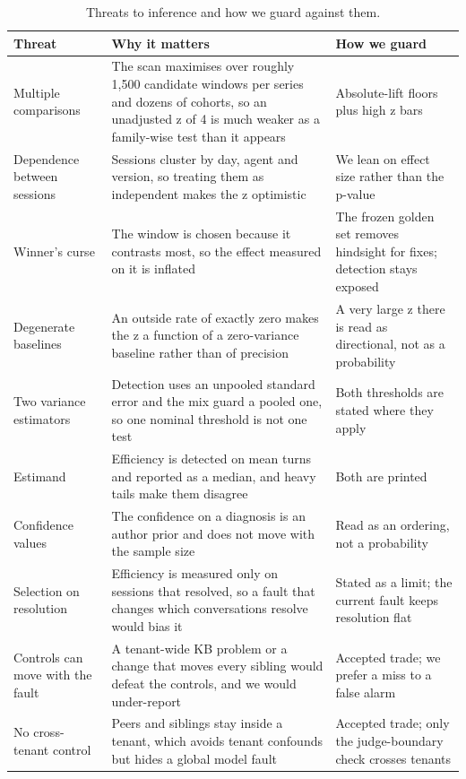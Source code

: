 \documentclass[8pt,twocolumn,a4paper]{extarticle}
\begin{document}
\begin{table}[t]
\centering
\caption{Threats to inference and how we guard against them.}
\label{tab:threats}
\small
\begin{tabular}{p{}p{}p{}}
\toprule
\textbf{Threat} & \textbf{Why it matters} & \textbf{How we guard} \\
\midrule
Multiple comparisons & The scan maximises over roughly 1,500 candidate windows per series and dozens of cohorts, so an unadjusted z of 4 is much weaker as a family-wise test than it appears & Absolute-lift floors plus high z bars \\
Dependence between sessions & Sessions cluster by day, agent and version, so treating them as independent makes the z optimistic & We lean on effect size rather than the p-value \\
Winner's curse & The window is chosen because it contrasts most, so the effect measured on it is inflated & The frozen golden set removes hindsight for fixes; detection stays exposed \\
Degenerate baselines & An outside rate of exactly zero makes the z a function of a zero-variance baseline rather than of precision & A very large z there is read as directional, not as a probability \\
Two variance estimators & Detection uses an unpooled standard error and the mix guard a pooled one, so one nominal threshold is not one test & Both thresholds are stated where they apply \\
Estimand & Efficiency is detected on mean turns and reported as a median, and heavy tails make them disagree & Both are printed \\
Confidence values & The confidence on a diagnosis is an author prior and does not move with the sample size & Read as an ordering, not a probability \\
Selection on resolution & Efficiency is measured only on sessions that resolved, so a fault that changes which conversations resolve would bias it & Stated as a limit; the current fault keeps resolution flat \\
Controls can move with the fault & A tenant-wide KB problem or a change that moves every sibling would defeat the controls, and we would under-report & Accepted trade; we prefer a miss to a false alarm \\
No cross-tenant control & Peers and siblings stay inside a tenant, which avoids tenant confounds but hides a global model fault & Accepted trade; only the judge-boundary check crosses tenants \\
\bottomrule
\end{tabular}
\end{table}
\end{document}
